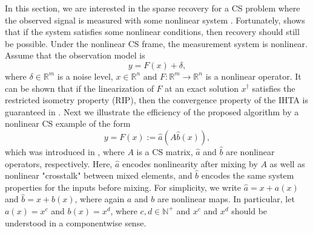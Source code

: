 \documentclass[a4paper,12pt]{article}
\numberwithin{equation}{section}
\begin{document}

\par In this section, we are interested in the sparse recovery for a CS problem where the observed signal is measured with some nonlinear system \cite{B13, YWLJWJ15}. Fortunately, \cite{B13} shows that if the system satisfies some nonlinear conditions, then recovery should still be possible. Under the nonlinear CS frame, the measurement system is nonlinear. Assume that the observation model is 
\begin{equation}\label{equ5.1}
    y=F\left(x\right)+\delta,
\end{equation}
where $\delta\in\mathbb{R}^{m}$ is a noise level, $x\in\mathbb{R}^{n}$ and $F:\mathbb{R}^{m}\rightarrow\mathbb{R}^{n}$ is a nonlinear operator. It can be shown that if the linearization of $F$ at an exact solution $x^{\dagger}$ satisfies the restricted isometry property (RIP), then the convergence property of the IHTA is guaranteed in \cite{B13}. Next we illustrate the efficiency of the proposed algorithm by a nonlinear CS example of the form
\begin{equation}\label{equ5.2}
    y=F\left(x\right):=\hat{a}\left(A\hat{b}\left(x\right)\right),
\end{equation}
which was introduced in \cite{B13}, where $A$ is a CS matrix, $\hat{a}$ and $\hat{b}$ are nonlinear operators, respectively. Here, $\hat{a}$ encodes nonlinearity after mixing by $A$ as well as nonlinear "crosstalk" between mixed elements, and $\hat{b}$ encodes the same system properties for the inputs before mixing. For simplicity, we write $\hat{a}=x+a\left(x\right)$ and $\hat{b}=x+b\left(x\right)$, where again $a$ and $b$ are nonlinear maps. In particular, let $a\left(x\right)=x^{c}$ and $b\left(x\right)=x^{d}$, where $c,d\in\mathbb{N}^{+}$ and $x^{c}$ and $x^{d}$ should be understood in a componentwise sense.
\end{document}
